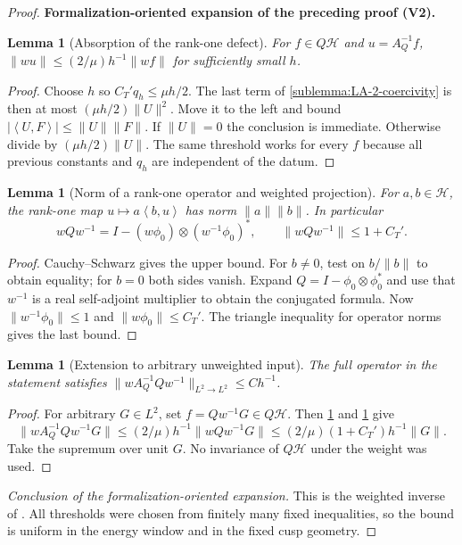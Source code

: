 \documentclass[11pt]{article}
\newtheorem{lemma}[theorem]{Lemma}
\newcommand{\formalisationparentid}{X}
\newenvironment{formalisationaddition}[1]{\par\medskip\begingroup\color{blue}\def\formalisationparentid{#1}\setcounter{formalizationsublemma}{0}\let\lemma\formalizationsublemma\let\endlemma\endformalizationsublemma
  \def\Eo{\mathcal E_h^\circ}\def\EE{\mathcal E_h}\def\phio{\phi_h^\circ}\def\phih{\phi_h}\def\Ho{H_h^{\rm atom}(v^\circ)}\def\Ha{H_h^{\rm atom}}\def\HL{H_h^{L}}\def\Dh{D_h}\def\Log{\operatorname{Log}}\def\ellh{\ell_h}\def\Gp{G_{p,h}}\def\Ast{A_{*,h}}\def\ahat{\widehat{\mathfrak a}_h}\def\ah{\mathfrak a_h}\def\rh{\widehat\rho_h}\def\deltah{\widehat\delta_h}\def\oldref##1{\textup{(##1)}}\def\interface##1{\par\noindent\textit{Analytical interface used here.} ##1\par}\def\finish{\par\noindent\textit{Conclusion of the formalization-oriented expansion.} }\par\noindent\textbf{Formalization-oriented expansion of the preceding proof (V2).}\par\smallskip
}{\par\endgroup\medskip
}
\newcommand{\ip}[2]{\left\langle #1,#2\right\rangle}
\begin{document}
\begin{proof}
\begin{formalisationaddition}{LA.2}
\begin{lemma}[Absorption of the rank-one defect]\label{sublemma:LA-2-absorption}
For $f\in Q\mathcal H$ and $u=A_Q^{-1}f$,
$\|wu\|\le (2/\mu)h^{-1}\|wf\|$ for sufficiently small $h$.
\end{lemma}
\begin{proof}
Choose $h$ so $C_T'q_h\le\mu h/2$. The last term of
\ref{sublemma:LA-2-coercivity} is then at most
$(\mu h/2)\|U\|^2$. Move it to the left and bound
$|\ip U F|\le\|U\|\|F\|$.
If $\|U\|=0$ the conclusion is immediate. Otherwise divide by
$(\mu h/2)\|U\|$. The same threshold works for every $f$ because all
previous constants and $q_h$ are independent of the datum.
\end{proof}

\begin{lemma}[Norm of a rank-one operator and weighted projection]\label{sublemma:LA-2-rank-one-norm}
For $a,b\in\mathcal H$, the rank-one map $u\mapsto a\ip bu$ has norm
$\|a\|\|b\|$. In particular
\[
 wQw^{-1}=I-(w\phi_0)\otimes(w^{-1}\phi_0)^*,\qquad
 \|wQw^{-1}\|\le1+C_T'.
\]
\end{lemma}
\begin{proof}
Cauchy--Schwarz gives the upper bound. For $b\ne0$, test on
$b/\|b\|$ to obtain equality; for $b=0$ both sides vanish.
Expand $Q=I-\phi_0\otimes\phi_0^*$ and use that $w^{-1}$ is a real
self-adjoint multiplier to obtain the conjugated formula.
Now $\|w^{-1}\phi_0\|\le1$ and $\|w\phi_0\|\le C_T'$.
The triangle inequality for operator norms gives the last bound.
\end{proof}

\begin{lemma}[Extension to arbitrary unweighted input]\label{sublemma:LA-2-projection-norm}
The full operator in the statement satisfies
$\|wA_Q^{-1}Qw^{-1}\|_{L^2\to L^2}\le C h^{-1}$.
\end{lemma}
\begin{proof}
For arbitrary $G\in L^2$, set $f=Qw^{-1}G\in Q\mathcal H$.
Then \ref{sublemma:LA-2-absorption} and
\ref{sublemma:LA-2-rank-one-norm} give
\[
 \|wA_Q^{-1}Qw^{-1}G\|
 \le(2/\mu)h^{-1}\|wQw^{-1}G\|
 \le(2/\mu)(1+C_T')h^{-1}\|G\|.
\]
Take the supremum over unit $G$. No invariance of $Q\mathcal H$ under
the weight was used.
\end{proof}
\finish This is the weighted inverse of .
All thresholds were chosen from finitely many fixed inequalities, so the
bound is uniform in the energy window and in the fixed cusp geometry.
\end{formalisationaddition}

\end{proof}
\end{document}
